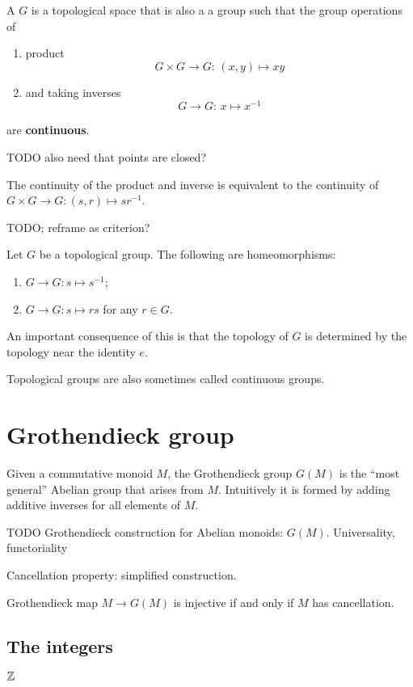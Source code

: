 \begin{definition}
A  $G$ is a topological space that is also a a group such that the group operations of
\begin{enumerate}
\item product
\[ G\times G \to G: \, (x,y)\mapsto xy \]
\item and taking inverses
\[ G\to G: \, x\mapsto x^{-1} \]
\end{enumerate}
are \textbf{continuous}.
\end{definition}
TODO also need that points are closed?

\begin{lemma}
The continuity of the product and inverse is equivalent to the continuity of $G\times G \to G: (s,r)\mapsto sr^{-1}$.
\end{lemma}
TODO; reframe as criterion?

\begin{lemma}
Let $G$ be a topological group. The following are homeomorphisms:
\begin{enumerate}
\item $G\to G: s\mapsto s^{-1}$;
\item $G\to G: s\mapsto rs$ for any $r\in G$.
\end{enumerate}
\end{lemma}
An important consequence of this is that the topology of $G$ is determined by the topology near the identity $e$.

Topological groups are also sometimes called continuous groups.



\section{Grothendieck group}
Given a commutative monoid $M$, the Grothendieck group $G(M)$ is the ``most general'' Abelian group that arises from $M$. Intuitively it is formed by adding additive inverses for all elements of $M$.



 
TODO Grothendieck construction for Abelian monoids: $G(M)$.
Universality, functoriality

Cancellation property: simplified construction.

Grothendieck map $M\to G(M)$ is injective \textup{if and only if} $M$ has cancellation.

\subsection{The integers}
\begin{definition}
$\mathbb{Z}$
\end{definition}


